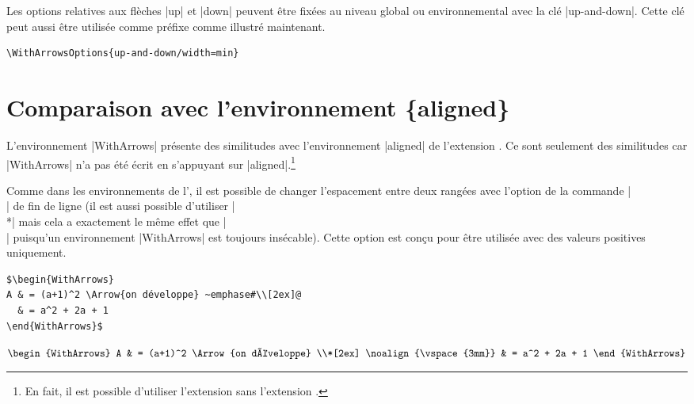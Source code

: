 \documentclass[dvipsnames]{article}%
\def\interitem{\vspace{7mm plus 2 mm minus 3mm}}
\begin{document}
\begin{WithArrows}
\begin{WithArrows}[rr]
\vspace{1cm}
Les options relatives aux flèches |up| et |down| peuvent être fixées au niveau global ou environnemental avec la
clé |up-and-down|. Cette clé peut aussi être utilisée comme préfixe comme illustré maintenant.
%
\begin{Verbatim}
\WithArrowsOptions{up-and-down/width=min}
\end{Verbatim}

\interitem

\section{Comparaison avec l'environnement \{aligned\}}

L'environnement |{WithArrows}| présente des similitudes avec l'environnement |{aligned}| de l'extension
. Ce sont seulement des similitudes car |{WithArrows}| n'a pas été écrit en s'appuyant sur
|{aligned}|.\footnote{En fait, il est possible d'utiliser l'extension  sans l'extension
  .}

\interitem 
Comme dans les environnements de l', il est possible de changer l'espacement entre deux rangées avec
l'option de la commande |\\| de fin de ligne (il est aussi possible d'utiliser |\\*| mais cela a
exactement le même effet que |\\| puisqu'un environnement |{WithArrows}| est toujours insécable). Cette
option est conçu pour être utilisée avec des valeurs positives uniquement.
%
\begin{Verbatim}
$\begin{WithArrows}
A & = (a+1)^2 \Arrow{on développe} ~emphase#\\[2ex]@
  & = a^2 + 2a + 1 
\end{WithArrows}$
\end{Verbatim}

$\begin{WithArrows}
A & = (a+1)^2 \Arrow{on développe} \\*[2ex]
\noalign{\vspace{3mm}}
  & = a^2 + 2a + 1 
\end{WithArrows}$



\end{WithArrows}
\end{WithArrows}
\end{document}
